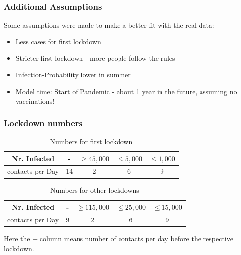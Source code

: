 \documentclass{beamer}
\begin{document}

\begin{frame}
\frametitle{Additional Assumptions}
Some assumptions were made to make a better fit with the real data:

\begin{itemize}
  \item Less cases for first lockdown
  \item Stricter first lockdown - more people follow the rules
  \item Infection-Probability lower in summer
  \item Model time: Start of Pandemic - about 1 year in the future, assuming no vaccinations!
\end{itemize}
\end{frame}



\begin{frame}
  \frametitle{Lockdown numbers}

  \begin{table}[!h]
  \begin{center}
  \begin{tabular}{|c||c|c|c|c|}
  \hline
    Nr. Infected &- & $\geq 45,000$ & $\leq 5,000$ & $\leq 1,000$ \\
    \hline
    contacts per Day & 14 & 2 & 6 & 9 \\
    \hline
  \end{tabular}
  \end{center}
  \caption{Numbers for first lockdown}
  \end{table}

  \begin{table}[!h]
  \begin{center}
  \begin{tabular}{|c||c|c|c|c|}
  \hline
    Nr. Infected &- & $\geq 115,000$ & $\leq 25,000$ & $\leq 15,000$ \\
    \hline
    contacts per Day & 9 & 2 & 6 & 9 \\
    \hline
  \end{tabular}
  \end{center}
  \caption{Numbers for other lockdowns}
  \end{table}

  Here the $-$ column means number of contacts per day before the respective lockdown.
\end{frame}
\end{document}
